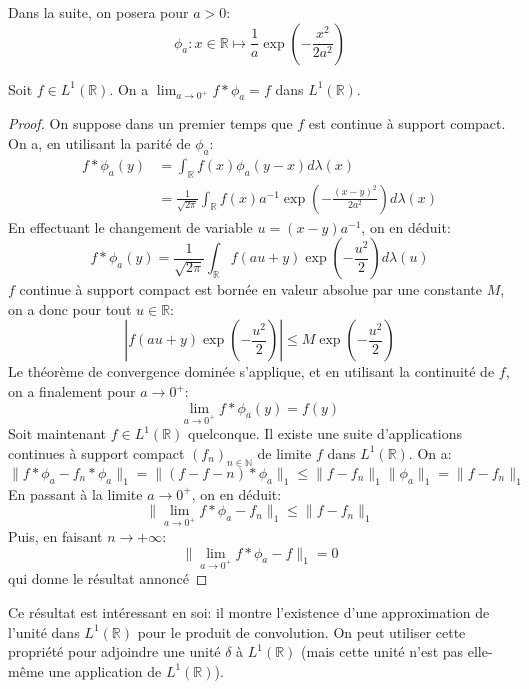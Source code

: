 Dans la suite, on posera pour $a > 0$:
\[
\phi_a \colon x \in \mathbb{R} \mapsto \frac{1}{a}
\exp\left(-\frac{x^2}{2a^2}\right)
\]
\begin{lemme}\label{fourier:4}
Soit $f \in L^1(\mathbb{R})$. On a $\lim_{a \to 0^+} f *
\phi_a = f$ dans $L^1(\mathbb{R})$.
\end{lemme}
\begin{proof}
On suppose dans un premier temps que $f$ est continue à support compact.
On a, en utilisant la parité de $\phi_a$:
\begin{align*}
f * \phi_a(y) & = \int_{\mathbb{R}} f(x) \phi_a(y-x) d \lambda(x) \\
&= \frac{1}{\sqrt{2\pi}} \int_\mathbb{R} f(x) a^{-1}
\exp\left(-\frac{(x-y)^2}{2a^2}\right) d \lambda(x)
\end{align*}
En effectuant le changement de variable $u=(x-y)a^{-1}$, on en déduit:
\[
f * \phi_a(y) = \frac{1}{\sqrt{2\pi}} \int_{\mathbb{R}} f(au+y)
\exp\left(-\frac{u^2}{2}\right) d\lambda(u)
\]
$f$ continue à support compact est bornée en valeur absolue par une constante
$M$, on a donc pour tout $u \in \mathbb{R}$:
\[
\left|f(au+y)
\exp\left(-\frac{u^2}{2}\right)\right| \leq M \exp\left(-\frac{u^2}{2}\right)
\]
Le théorème de convergence dominée s'applique, et en utilisant la continuité de
$f$, on a finalement pour $a \to 0^+$:
\[
\lim_{a \to 0^+} f * \phi_a(y) = f(y)
\]
Soit maintenant $f\in L^1(\mathbb{R})$ quelconque. Il existe une suite
d'applications continues à support compact $(f_n)_{n \in \mathbb{N}}$ de limite
$f$ dans $L^1(\mathbb{R})$. On a:
\[
\|f*\phi_a - f_n*\phi_a\|_1 = \|(f-f-n)*\phi_a\|_1 \leq \|f-f_n\|_1\|\phi_a\|_1
= \|f-f_n\|_1
\]
En passant à la limite $a \to 0^+$, on en déduit:
\[
\|\lim_{a\to 0^+}f*\phi_a - f_n\|_1  \leq \|f-f_n\|_1
\]
Puis, en faisant $n \to +\infty$:
\[
\|\lim_{a\to 0^+}f*\phi_a - f\|_1 = 0
\]
qui donne le résultat annoncé
\end{proof}
Ce résultat est intéressant en soi: il montre l'existence d'une approximation de
l'unité dans $L^1(\mathbb{R})$ pour le produit de convolution. On peut
utiliser cette propriété pour adjoindre une unité $\delta$ à $L^1(\mathbb{R})$
(mais cette unité n'est pas elle-même une application de $L^1(\mathbb{R})$). 

